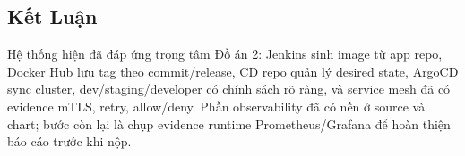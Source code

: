 \subsection{Kết Luận}

Hệ thống hiện đã đáp ứng trọng tâm Đồ án 2: Jenkins sinh image từ app repo, Docker
Hub lưu tag theo commit/release, CD repo quản lý desired state, ArgoCD sync cluster,
dev/staging/developer có chính sách rõ ràng, và service mesh đã có evidence mTLS,
retry, allow/deny. Phần observability đã có nền ở source và chart; bước còn lại là
chụp evidence runtime Prometheus/Grafana để hoàn thiện báo cáo trước khi nộp.
